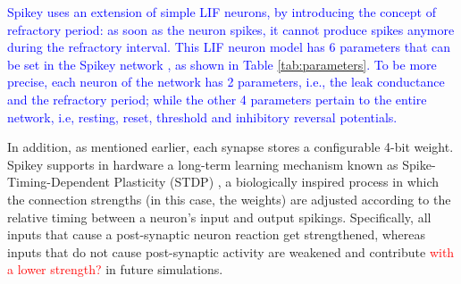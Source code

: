 \documentclass[utf8]{frontiersFPHY} %
\begin{document}
\textcolor{blue}{Spikey uses an extension of simple LIF neurons, by introducing the concept  of refractory period: as soon as the neuron spikes, it cannot produce  spikes anymore during the refractory interval. 
This LIF neuron model has 6 parameters that can be set in the Spikey network \cite{Pfeil2013}, as shown in Table \ref{tab:parameters}. 
To be more precise, each neuron of the network has 2 parameters, i.e., the leak conductance and the refractory period; while the other 4 parameters pertain to the entire network, i.e, resting, reset, threshold and inhibitory reversal potentials.}

In addition, as mentioned earlier, each synapse stores a configurable 4-bit weight.
Spikey supports in hardware a long-term learning mechanism known as Spike-Timing-Dependent Plasticity (STDP) \cite{schemmel2006implementing}, a biologically inspired process in which the connection strengths (in this case, the weights) are adjusted according to the relative timing between a neuron's input and output spikings.
Specifically, all inputs that cause a post-synaptic neuron reaction get strengthened, whereas inputs that do not cause post-synaptic activity are weakened and contribute \textcolor{red}{with a lower strength?} in future simulations.
\end{document}
